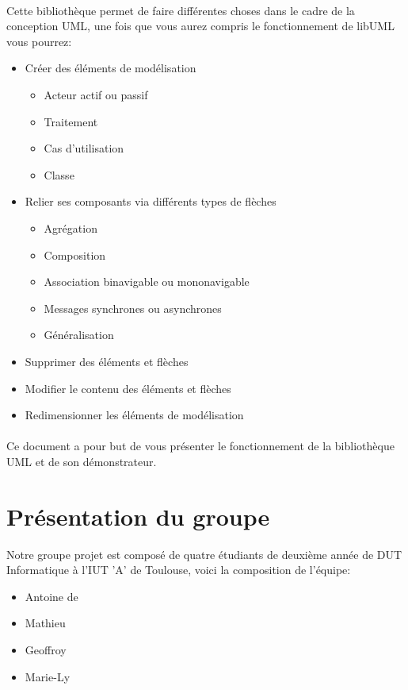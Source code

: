 	\paragraph{}	
	Cette bibliothèque permet de faire différentes choses dans le cadre de la conception UML, une fois que vous aurez compris le fonctionnement de libUML vous pourrez:
	\begin{itemize}
		\item Créer des éléments de modélisation 
			\begin{itemize}
				\item Acteur actif ou passif
				\item Traitement
				\item Cas d'utilisation
				\item Classe
			\end{itemize}
		\item Relier ses composants via différents types de flèches
			\begin{itemize}
				\item Agrégation
				\item Composition
				\item Association binavigable ou mononavigable
				\item Messages synchrones ou asynchrones
				\item Généralisation
			\end{itemize}
		\item Supprimer des éléments et flèches
		\item Modifier le contenu des éléments et flèches
		\item Redimensionner les éléments de modélisation
	\end{itemize}
	\paragraph{}
Ce document a pour but de vous présenter le fonctionnement de la bibliothèque UML et de son démonstrateur. 

\section*{Présentation du groupe}
	Notre groupe projet est composé de quatre étudiants de deuxième année de DUT Informatique à l'IUT 'A' de Toulouse, voici la composition de l'équipe: 
	\begin{itemize}
		\item Antoine de  
		\item Mathieu  
		\item Geoffroy 
		\item Marie-Ly  
	\end{itemize}
